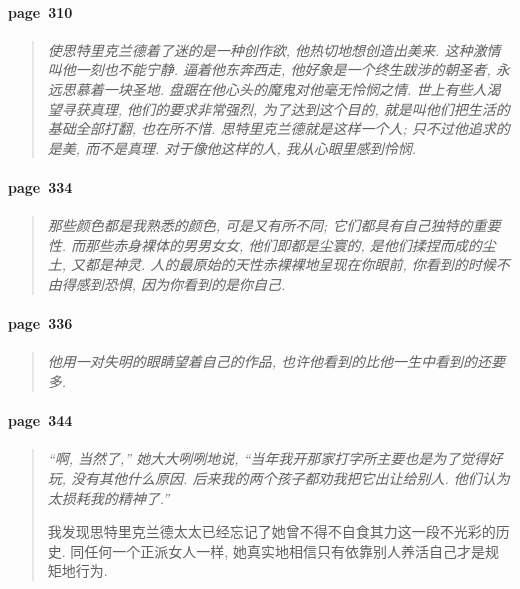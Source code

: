 \paragraph*{page~310}
\begin{quotation}
    \itshape
    使思特里克兰德着了迷的是一种创作欲, 他热切地想创造出美来. 这种激情叫他一刻也不能宁静. 逼着他东奔西走, 他好象是一个终生跋涉的朝圣者, 永远思慕着一块圣地. 盘踞在他心头的魔鬼对他毫无怜悯之情. 世上有些人渴望寻获真理, 他们的要求非常强烈, 为了达到这个目的, 就是叫他们把生活的基础全部打翻, 也在所不惜. 思特里克兰德就是这样一个人; 只不过他追求的是美, 而不是真理. 对于像他这样的人, 我从心眼里感到怜悯. 
\end{quotation}

\paragraph*{page~334}
\begin{quotation}
    \itshape
    那些颜色都是我熟悉的颜色, 可是又有所不同; 它们都具有自己独特的重要性. 而那些赤身裸体的男男女女, 他们即都是尘寰的, 是他们揉捏而成的尘土, 又都是神灵. 人的最原始的天性赤裸裸地呈现在你眼前, 你看到的时候不由得感到恐惧, 因为你看到的是你自己. 
\end{quotation}

\paragraph*{page~336}
\begin{quotation}
    \itshape
    他用一对失明的眼睛望着自己的作品, 也许他看到的比他一生中看到的还要多.
\end{quotation}

\paragraph*{page~344}
\begin{quotation}
    \itshape
    ``啊, 当然了,'' 她大大咧咧地说, ``当年我开那家打字所主要也是为了觉得好玩, 没有其他什么原因. 后来我的两个孩子都劝我把它出让给别人. 他们认为太损耗我的精神了.''

    我发现思特里克兰德太太已经忘记了她曾不得不自食其力这一段不光彩的历史. 同任何一个正派女人一样, 她真实地相信只有依靠别人养活自己才是规矩地行为. 
\end{quotation}

